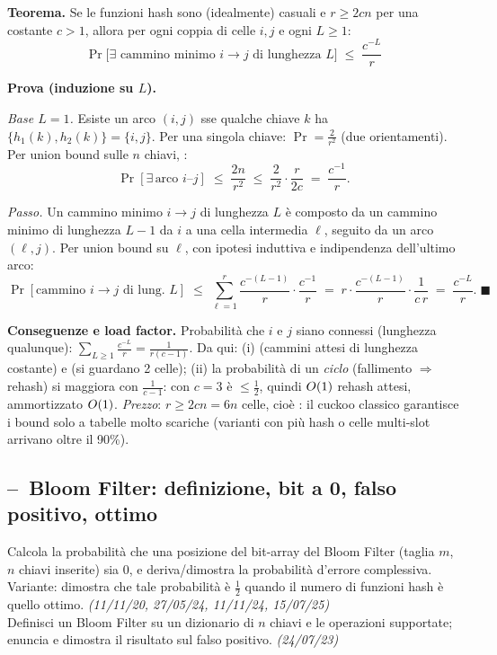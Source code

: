 \textbf{Teorema.} Se le funzioni hash sono (idealmente) casuali e $r\ge 2cn$ per una costante
$c>1$, allora per ogni coppia di celle $i,j$ e ogni $L\ge1$:
\[
\boxed{\ \Pr\bigl[\exists\text{ cammino minimo }i\to j\text{ di lunghezza }L\bigr]
\;\le\;\frac{c^{-L}}{r}\ }
\]

\textbf{Prova (induzione su $L$).}

\emph{Base $L=1$.} Esiste un arco $(i,j)$ sse qualche chiave $k$ ha $\{h_1(k),h_2(k)\}=\{i,j\}$.
Per una singola chiave: $\Pr=\frac{2}{r^2}$ (due orientamenti). Per union bound sulle $n$ chiavi,
:
\[
\Pr[\exists\,\text{arco } i\text{--}j]\;\le\;\frac{2n}{r^{2}}
\;\le\;\frac{2}{r^{2}}\cdot\frac{r}{2c}\;=\;\frac{c^{-1}}{r}.
\]

\emph{Passo.} Un cammino minimo $i\to j$ di lunghezza $L$ \`e composto da un cammino minimo di
lunghezza $L-1$ da $i$ a una cella intermedia $\ell$, seguito da un arco $(\ell,j)$. Per union
bound su $\ell$, con ipotesi induttiva e indipendenza dell'ultimo arco:
\[
\Pr[\text{cammino }i\to j\text{ di lung. }L]
\;\le\;\sum_{\ell=1}^{r}\frac{c^{-(L-1)}}{r}\cdot\frac{c^{-1}}{r}
\;=\;r\cdot\frac{c^{-(L-1)}}{r}\cdot\frac{1}{c\,r}
\;=\;\frac{c^{-L}}{r}. \;\blacksquare
\]

\textbf{Conseguenze e load factor.} Probabilit\`a che $i$ e $j$ siano connessi (lunghezza
qualunque): $\sum_{L\ge1}\frac{c^{-L}}{r}=\frac{1}{r(c-1)}$. Da qui:
(i)  (cammini attesi di lunghezza costante) e  (si guardano 2 celle);
(ii) la probabilit\`a di un \emph{ciclo} (fallimento $\Rightarrow$ rehash) si maggiora con
$\frac{1}{c-1}$: con $c=3$ \`e $\le\frac12$, quindi $O\!\left(1\right)$ rehash attesi, ammortizzato $O\!\left(1\right)$.
\emph{Prezzo}: $r\ge2cn=6n$ celle, cio\`e : il cuckoo classico
garantisce i bound solo a tabelle molto scariche (varianti con pi\`u hash o celle multi-slot
arrivano oltre il 90\%).

\subsection*{--\hot\ Bloom Filter: definizione, bit a 0, falso positivo, ottimo}

\begin{domanda}
 Calcola la probabilit\`a che una posizione del bit-array del Bloom Filter (taglia $m$,
$n$ chiavi inserite) sia 0, e deriva/dimostra la probabilit\`a d'errore complessiva. Variante:
dimostra che tale probabilit\`a \`e $\tfrac12$ quando il numero di funzioni hash \`e quello
ottimo. \emph{(11/11/20, 27/05/24, 11/11/24, 15/07/25)}\\
 Definisci un Bloom Filter su un dizionario di $n$ chiavi e le operazioni supportate;
enuncia e dimostra il risultato sul falso positivo. \emph{(24/07/23)}
\end{domanda}

